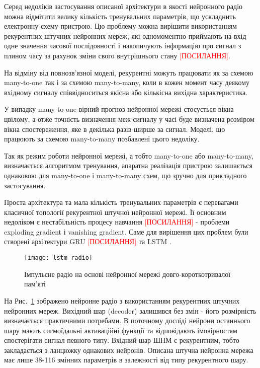 Серед недоліків застосування описаної архітектури в якості нейронного радіо
можна відмітити велику кількість тренувальних параметрів, що ускладнить 
електронну схему пристрою. Цю проблему можна вирішити використанням 
рекурентних штучних нейронних мереж, які одномоментно приймають на вхід 
одне значення часової послідовності і накопичують інформацію про сигнал 
з плином часу за рахунок зміни свого внутрішнього стану 
\textcolor{red}{[ПОСИЛАННЯ]}.

На відміну від повнозв'язної моделі, рекурентні можуть працювати як за схемою
many-to-one так і за схемою many-to-many, коли в кожен момент часу деякому 
вхідному сигналу співвідноситься якісна або кількісна вихідна характеристика.

У випадку many-to-one вірний прогноз нейронної мережі стосується вікна цвілому, 
а отже точність визначення меж сигналу у часі буде визначена розміром вікна 
спостереження, яке в декілька разів ширше за сигнал. Моделі, що працюють за 
схемою many-to-many позбавлені цього недоліку.

Так як режим роботи нейронної мережі, а тобто many-to-one або many-to-many,
визначається алгоритмом тренування, апаратна реалізація пристрою залишається 
однаковою для many-to-one і many-to-many схем, що зручно для прикладного 
застосування.

Проста архітектура та мала кількість тренувальних параметрів є 
перевагами класичної топології рекурентної штучної нейронної мережі.
Її основним недоліком є нестабільність процесу навчання 
\textcolor{red}{[ПОСИЛАННЯ]} - проблеми exploding gradient і 
vanishing gradient. Саме для вирішення цих проблем були створені архітектури 
GRU \textcolor{red}{[ПОСИЛАННЯ]} та LSTM \cite{imp:Hochreiter1997}.

\begin{figure}[htbp] \begin{center}
\texttt{[image: lstm\_radio]}
\caption{Імпульсне радіо на основі нейронної мережі 
довго-короткотривалої пам'яті} \label{fig:lstm_radio}
\end{center} \end{figure}

На Рис.~\ref{fig:lstm_radio} зображено нейронне радіо з використанням 
рекурентних штучних нейронних мереж. Вихідний шар (decoder) залишився без 
змін - його розмірність визначається практичними потребами. В поточному 
досліді нейрони останнього шару мають сигмоїдальні активаційні функції 
та відповідають імовірностям спостерігати сигнал певного типу. Вхідний 
шар ШНМ є рекурентним, тобто закладається з ланцюжку однакових нейронів.
Описана штучна нейронна мережа має лише 38-116 змінних параметрів в 
залежності від типу рекурентного шару.

